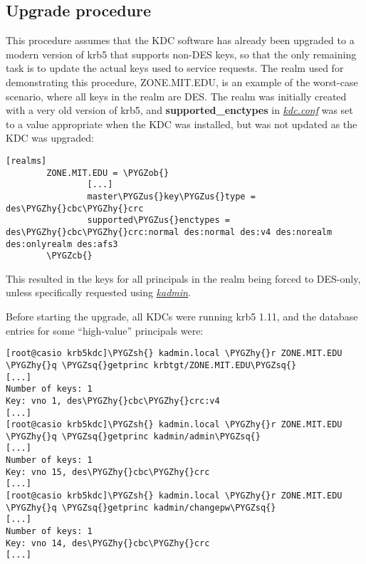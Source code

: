\documentclass[letterpaper,10pt,english]{sphinxmanual}
\def\PYGZus{\char`\_}
\def\PYGZob{\char`\{}
\def\PYGZcb{\char`\}}
\def\PYGZsh{\char`\#}
\def\PYGZhy{\char`\-}
\def\PYGZsq{\char`\'}
\begin{document}
\subsection{Upgrade procedure}
\label{admin/advanced/retiring-des:upgrade-procedure}
This procedure assumes that the KDC software has already been upgraded
to a modern version of krb5 that supports non-DES keys, so that the
only remaining task is to update the actual keys used to service requests.
The realm used for demonstrating this procedure, ZONE.MIT.EDU,
is an example of the worst-case scenario, where all keys in the realm
are DES.  The realm was initially created with a very old version of krb5,
and \textbf{supported\_enctypes} in {\hyperref[admin/conf_files/kdc_conf:kdc-conf-5]{\emph{kdc.conf}}} was set to a value
appropriate when the KDC was installed, but was not updated as the KDC
was upgraded:

\begin{Verbatim}[commandchars=\\\{\}]
[realms]
        ZONE.MIT.EDU = \PYGZob{}
                [...]
                master\PYGZus{}key\PYGZus{}type = des\PYGZhy{}cbc\PYGZhy{}crc
                supported\PYGZus{}enctypes = des\PYGZhy{}cbc\PYGZhy{}crc:normal des:normal des:v4 des:norealm des:onlyrealm des:afs3
        \PYGZcb{}
\end{Verbatim}

This resulted in the keys for all principals in the realm being forced
to DES-only, unless specifically requested using {\hyperref[admin/admin_commands/kadmin_local:kadmin-1]{\emph{kadmin}}}.

Before starting the upgrade, all KDCs were running krb5 1.11,
and the database entries for some ``high-value'' principals were:

\begin{Verbatim}[commandchars=\\\{\}]
[root@casio krb5kdc]\PYGZsh{} kadmin.local \PYGZhy{}r ZONE.MIT.EDU \PYGZhy{}q \PYGZsq{}getprinc krbtgt/ZONE.MIT.EDU\PYGZsq{}
[...]
Number of keys: 1
Key: vno 1, des\PYGZhy{}cbc\PYGZhy{}crc:v4
[...]
[root@casio krb5kdc]\PYGZsh{} kadmin.local \PYGZhy{}r ZONE.MIT.EDU \PYGZhy{}q \PYGZsq{}getprinc kadmin/admin\PYGZsq{}
[...]
Number of keys: 1
Key: vno 15, des\PYGZhy{}cbc\PYGZhy{}crc
[...]
[root@casio krb5kdc]\PYGZsh{} kadmin.local \PYGZhy{}r ZONE.MIT.EDU \PYGZhy{}q \PYGZsq{}getprinc kadmin/changepw\PYGZsq{}
[...]
Number of keys: 1
Key: vno 14, des\PYGZhy{}cbc\PYGZhy{}crc
[...]
\end{Verbatim}
\end{document}
